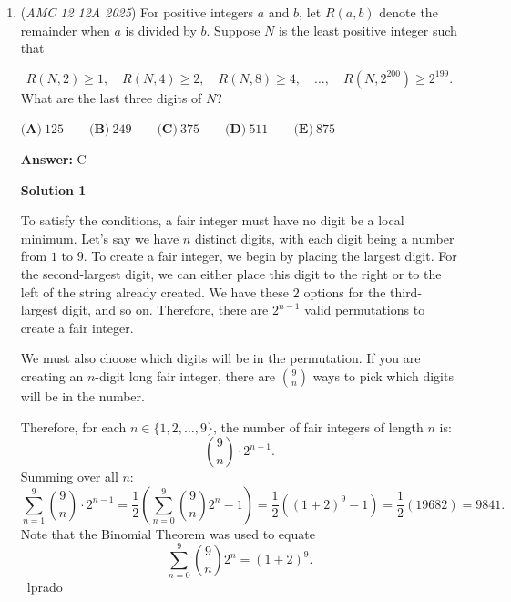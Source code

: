 \begin{enumerate}
\textbf{Solution 3}

Let $a,b,c$ be three independent random variables distributed uniformly on $[0,1]$. By symmetry, either 3 could be the greatest. WLOG, let $a$ be the greatest.When $a=x$, we need to have $b,c<x/2$. Since $b$ and $c$ are uniformly distributed, the probability is $(x/2)^2=x^2/4$. Integrate:
 \[\int_0^1\frac{x^2}{4}dx=\frac{1}{12}\]Multiply it by 3 to account for symmetry:
 \[\frac{1}{12}\cdot3=\boxed{\frac{1}{4}}\]~dondee123

 


	\item (\textit{AMC 12 12A 2025}) For positive integers $a$ and $b$, let $R(a, b)$ denote the remainder when $a$ is divided by $b$. Suppose $N$ is the least positive integer such that

 \[R(N,2) \ge 1, \quad R(N,4) \ge 2, \quad R(N,8) \ge 4, \quad \dots, \quad R\left(N,2^{200}\right) \ge 2^{199}.\]
What are the last three digits of $N$?


 $\textbf{(A)}\   125  \qquad                 \textbf{(B)}\   249  \qquad                 \textbf{(C)}\   375  \qquad                 \textbf{(D)}\   511  \qquad                 \textbf{(E)}\   875$

 \textbf{Answer: }C



\textbf{Solution 1}

To satisfy the conditions, a fair integer must have no digit be a local minimum. Let's say we have $n$ distinct digits, with each digit being a number from $1$ to $9$. To create a fair integer, we begin by placing the largest digit. For the second-largest digit, we can either place this digit to the right or to the left of the string already created. We have these $2$ options for the third-largest digit, and so on. Therefore, there are $2^{n-1}$ valid permutations to create a fair integer.

 We must also choose which digits will be in the permutation. If you are creating an $n$-digit long fair integer, there are $\binom{9}{n}$ ways to pick which digits will be in the number.

 Therefore, for each $n \in \{1,2,\dots, 9\}$, the number of fair integers of length $n$ is:
 \[\binom{9}{n} \cdot 2^{n-1}.\]Summing over all $n$:
 \[\sum_{n=1}^9{\binom{9}{n} \cdot 2^{n-1}}=\frac{1}{2}\left(\sum_{n=0}^9{\binom{9}{n}}2^n -1\right)=\frac{1}{2}\left((1+2)^9 -1 \right) = \frac{1}{2}(19682) = \boxed{9841}.\]Note that the Binomial Theorem was used to equate
 \[\sum_{n=0}^9{\binom{9}{n}}2^n = (1+2)^9.\]~lprado


\end{enumerate}
